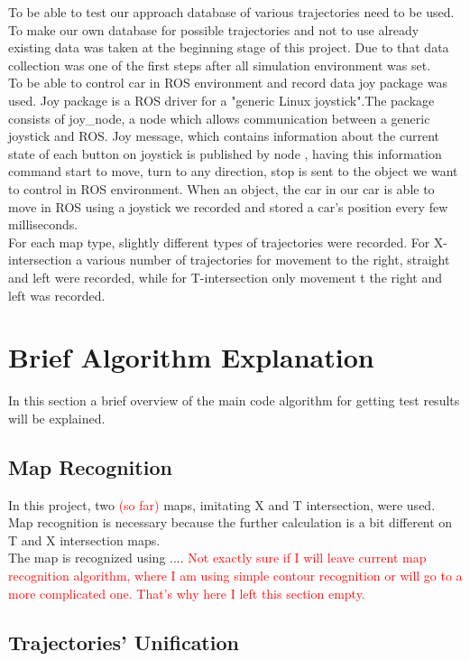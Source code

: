 To be able to test our approach database of various trajectories need to be used. To make our own database for possible trajectories and not to use already existing data was taken at the beginning stage of this project. Due to that data collection was one of the first steps after all simulation environment was set. \\
To be able to control car in \gls{ROS} environment and record data joy package was used. Joy package is a \gls{ROS} driver for a "generic Linux joystick".The package consists of joy\_node, a node which allows communication between a generic joystick and \gls{ROS}. Joy message, which contains information about the current state of each button on joystick is published by node \cite{ROSjoy}, having this information command start to move, turn to any direction, stop is sent to the object we want to control in \gls{ROS} environment. When an object, the car in our car is able to move in \gls{ROS} using a joystick we recorded and stored a car's position every few milliseconds. \\
For each map type, slightly different types of trajectories were recorded. For X-intersection a various number of trajectories for movement to the right, straight and left were recorded, while for T-intersection only movement t the right and left was recorded.

\section{Brief Algorithm Explanation}

In this section a brief overview of the main code algorithm for getting test results will be explained.

\subsection{Map Recognition}

In this project, two \textcolor{red}{(so far)} maps, imitating X and T intersection, were used. Map recognition is necessary because the further calculation is a bit different on T and X intersection maps. \\
The map is recognized using .... \textcolor{red}{Not exactly sure if I will leave current map recognition algorithm, where I am using simple contour recognition or will go to a more complicated one. That's why here I left this section empty.}

\subsection{Trajectories' Unification}

